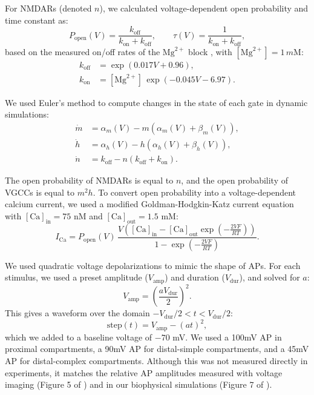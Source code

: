\documentclass[twocolumn]{theme/bioRxiv}
\begin{document}
For NMDARs (denoted $n$), we calculated voltage-dependent open probability and time constant as:
\begin{equation*}
P_{\mathrm{open}}(V) = \frac{k_{\mathrm{off}}}{k_{\mathrm{on}} + k_{\mathrm{off}}}, \qquad
\tau(V) = \frac{1}{k_{\mathrm{on}} + k_{\mathrm{off}}},
\end{equation*}
based on the measured on/off rates of the $\mathrm{Mg}^{2+}$ block \citep{jahrVoltageDependenceNMDAactivated1990}, with $[\mathrm{Mg}^{2+}] = 1\,m\mathrm{M}$:
\begin{align*}
k_{\mathrm{off}} &= \exp(0.017V + 0.96), \\
k_{\mathrm{on}} &= [\mathrm{Mg}^{2+}]\,\exp(-0.045V - 6.97).
\end{align*}

We used Euler's method to compute changes in the state of each gate in dynamic simulations:
\begin{align*}
\dot{m} &= \alpha_m(V) - m\left(\alpha_m(V) + \beta_m(V)\right), \\
\dot{h} &= \alpha_h(V) - h\left(\alpha_h(V) + \beta_h(V)\right), \\
\dot{n} &= k_{\mathrm{off}} - n\left(k_{\mathrm{off}} + k_{\mathrm{on}}\right).
\end{align*}

The open probability of NMDARs is equal to $n$, and the open probability of VGCCs is equal to $m^2h$. To convert open probability into a voltage-dependent calcium current, we used a modified Goldman-Hodgkin-Katz current equation with $[\mathrm{Ca}]_{\mathrm{in}} = 75$ nM and $[\mathrm{Ca}]_{\mathrm{out}} = 1.5$ mM:
\begin{equation*}
I_{\mathrm{Ca}} = P_{\mathrm{open}}(V)\,
\frac{V\left([\mathrm{Ca}]_{\mathrm{in}} - [\mathrm{Ca}]_{\mathrm{out}}\exp\!\left(-\frac{2VF}{RT}\right)\right)}{1 - \exp\!\left(-\frac{2VF}{RT}\right)}.
\end{equation*}

We used quadratic voltage depolarizations to mimic the shape of APs. For each stimulus, we used a preset amplitude ($V_{\mathrm{amp}}$) and duration ($V_{\mathrm{dur}}$), and solved for $a$:
\begin{equation*}
V_{\mathrm{amp}} = \left(\frac{aV_{\mathrm{dur}}}{2}\right)^2.
\end{equation*}
This gives a waveform over the domain $-V_{\mathrm{dur}}/2 < t < V_{\mathrm{dur}}/2$:
\begin{equation*}
\mathrm{step}(t) = V_{\mathrm{amp}} - (at)^2,
\end{equation*}
which we added to a baseline voltage of $-70$ mV. We used a 100mV AP in proximal compartments, a 90mV AP for distal-simple compartments, and a 45mV AP for distal-complex compartments. Although this was not measured directly in experiments, it matches the relative AP amplitudes measured with voltage imaging (Figure 5 of \citep{landauDendriticBranchStructure2022}) and in our biophysical simulations (Figure 7 of \citep{landauDendriticBranchStructure2022}).
\end{document}

